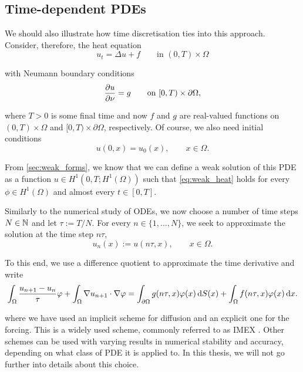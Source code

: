 \subsection{Time-dependent PDEs}

We should also illustrate how time discretisation ties into this approach. Consider, therefore, the heat equation
%
\begin{equation}
    \label{eq:fem_ex_heat}
    u_t = \Delta u + f \qquad \text{in } (0, T) \times \Omega
\end{equation}

\noindent
with Neumann boundary conditions
%
\begin{equation}
    \label{eq:fem_ex_neumann_heat}
    \pderiv[u]{\nu} = g \qquad \text{on } [0, T) \times \partial \Omega,
\end{equation}

\noindent
where $T > 0$ is some final time and now $f$ and $g$ are real-valued functions on $(0, T) \times \Omega$ and $[0, T) \times \partial \Omega$, respectively. Of course, we also need initial conditions
%
\begin{equation}
    \label{eq:fem_ex_initial}
    u(0, x) = u_0(x), \qquad x \in \Omega.
\end{equation}

\noindent
From \cref{sec:weak_forms}, we know that we can define a weak solution of this PDE as a function $u \in H^1(0, T; H^1(\Omega))$ such that \cref{eq:weak_heat} holds for every $\phi \in H^1(\Omega)$ and almost every $t \in [0, T]$.

Similarly to the numerical study of ODEs, we now choose a number of time steps $N \in \N$ and let $\tau := T/N$. For every $n \in \{1, \dots, N\}$, we seek to approximate the solution at the time step $n \tau$,
%
\begin{equation*}
    u_n(x) := u(n\tau, x), \qquad x \in \Omega.
\end{equation*}

\noindent
To this end, we use a difference quotient to approximate the time derivative and write
%
\begin{equation*}
    \int_{\Omega} \frac{u_{n + 1} - u_n}{\tau} \phi + \int_{\Omega} \nabla u_{n + 1} \cdot \nabla \phi = \int_{\partial \Omega} g(n \tau, x) \phi(x) \d S(x) + \int_\Omega f(n \tau, x) \phi(x) \d x .
\end{equation*}

\noindent
where we have used an implicit scheme for diffusion and an explicit one for the forcing. This is a widely used scheme, commonly referred to as IMEX \cite{ascher97,pareschi01,boscarino25}. Other schemes can be used with varying results in numerical stability and accuracy, depending on what class of PDE it is applied to. In this thesis, we will not go further into details about this choice.

